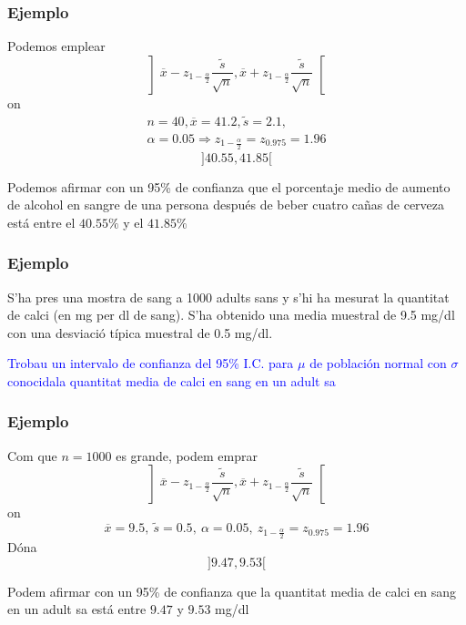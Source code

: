 \documentclass[12pt,t]{beamer}\usepackage[]{graphicx}\usepackage[]{color}
\newcommand{\blue}[1]{\textcolor{blue}{#1}}
\theoremstyle{plain}
\theoremstyle{definition}
\begin{document}
\begin{frame}
\frametitle{Ejemplo}
Podemos emplear
$$
\left]\overline{x}-z_{1-\frac{\alpha}{2}}\frac{\widetilde{s}}{\sqrt{n}},
    \overline{x}+z_{1-\frac{\alpha}{2}}\frac{\widetilde{s}}{\sqrt{n}}\right[
$$
on
$$
\begin{array}{c}
n=40,\overline{x}=41.2,\widetilde{s}=2.1,\\[1ex]
\alpha=0.05\Rightarrow z_{1-\frac{\alpha}{2}}=z_{0.975}=1.96
\end{array}
$$
\pause
$$
]40.55, 41.85[
$$

Podemos afirmar con un 95\% de confianza  que el porcentaje medio de  aumento de alcohol en sangre de una persona después de beber cuatro cañas de cerveza está entre el $40.55\%$ y el $41.85\%$


\end{frame}



\begin{frame}
\frametitle{Ejemplo}
\vspace*{-2ex}

S'ha pres una mostra de sang a 1000 adults sans y s'hi ha mesurat la quantitat  de calci (en mg per dl de sang). S'ha obtenido  una media   muestral de 9.5 mg/dl con una desviació típica muestral de 0.5 mg/dl. 
\medskip

\blue{Trobau un intervalo de confianza  del 95\% I.C. para $\mu$ de población normal con $\sigma$ conocidala quantitat media   de calci en sang en un adult sa}

\end{frame}


\begin{frame}
\frametitle{Ejemplo}
\vspace*{-2ex}

Com que $n=1000$ es grande, podem emprar
$$
\left]\overline{x}-z_{1-\frac{\alpha}{2}}\frac{\widetilde{s}}{\sqrt{n}},
    \overline{x}+z_{1-\frac{\alpha}{2}}\frac{\widetilde{s}}{\sqrt{n}}\right[
$$
on
$$
\overline{x}=9.5,\ \widetilde{s}=0.5,\
\alpha=0.05,\  z_{1-\frac{\alpha}{2}}=z_{0.975}=1.96
$$
Dóna
$$
]9.47, 9.53[
$$

Podem afirmar con un 95\% de confianza  que la quantitat media   de calci en sang en un adult sa está entre  $9.47$  y  $9.53$ mg/dl


\end{frame}
\end{document}
